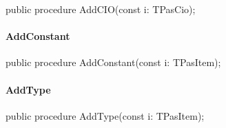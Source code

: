 \documentclass{report}
\newif\ifpdf
\begin{document}
\label{PasDoc_Items.TPasUnit-AddCIO}
\begin{list}{}{
\setlength{\itemindent}{0cm}
\setlength{\listparindent}{0cm}
\setlength{\leftmargin}{\evensidemargin}
\addtolength{\leftmargin}{\tmplength}
\settowidth{\labelsep}{X}
\addtolength{\leftmargin}{\labelsep}
\setlength{\labelwidth}{\tmplength}
}
\item[\textbf{Declaration}\hfill]
\ifpdf
\begin{flushleft}
\fi
\begin{ttfamily}
public procedure AddCIO(const i: TPasCio);\end{ttfamily}

\ifpdf
\end{flushleft}
\fi

\end{list}
\paragraph*{AddConstant}\hspace*{\fill}

\label{PasDoc_Items.TPasUnit-AddConstant}
\begin{list}{}{
\setlength{\itemindent}{0cm}
\setlength{\listparindent}{0cm}
\setlength{\leftmargin}{\evensidemargin}
\addtolength{\leftmargin}{\tmplength}
\settowidth{\labelsep}{X}
\addtolength{\leftmargin}{\labelsep}
\setlength{\labelwidth}{\tmplength}
}
\item[\textbf{Declaration}\hfill]
\ifpdf
\begin{flushleft}
\fi
\begin{ttfamily}
public procedure AddConstant(const i: TPasItem);\end{ttfamily}

\ifpdf
\end{flushleft}
\fi

\end{list}
\paragraph*{AddType}\hspace*{\fill}

\label{PasDoc_Items.TPasUnit-AddType}
\begin{list}{}{
\setlength{\itemindent}{0cm}
\setlength{\listparindent}{0cm}
\setlength{\leftmargin}{\evensidemargin}
\addtolength{\leftmargin}{\tmplength}
\settowidth{\labelsep}{X}
\addtolength{\leftmargin}{\labelsep}
\setlength{\labelwidth}{\tmplength}
}
\item[\textbf{Declaration}\hfill]
\ifpdf
\begin{flushleft}
\fi
\begin{ttfamily}
public procedure AddType(const i: TPasItem);\end{ttfamily}

\ifpdf
\end{flushleft}
\fi

\end{list}
\end{document}

